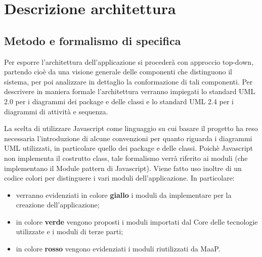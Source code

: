 \newpage
\section{Descrizione architettura}
\subsection{Metodo e formalismo di specifica}

Per esporre l'architettura dell'applicazione si procederà con approccio top-down, partendo cioè da una visione generale delle componenti che distinguono il sistema, per poi analizzare in dettaglio la conformazione di tali componenti.
Per descrivere in maniera formale l'architettura verranno impiegati lo standard UML 2.0 per i diagrammi dei package e delle classi e lo standard UML 2.4 per i diagrammi di attività e sequenza.

La scelta di utilizzare Javascript come linguaggio su cui basare il progetto ha reso necessaria l'introduzione di alcune convenzioni per quanto riguarda i diagrammi UML utilizzati, in particolare quello dei package e delle classi.
Poichè Javascript non implementa il costrutto class, tale formalismo verrà riferito ai moduli (che implementano il Module pattern di Javascript).
Viene fatto uso inoltre di un codice colori per distinguere i vari moduli dell'applicazione. In particolare:

\begin{itemize}
\item verranno evidenziati in colore \textbf{giallo} i moduli da implementare per la creazione dell'applicazione;
\item in colore \textbf{verde} vengono proposti i moduli importati dal Core delle tecnologie utilizzate e i moduli di terze parti;
\item in colore \textbf{rosso} vengono evidenziati i moduli riutilizzati da MaaP.
\end{itemize}

